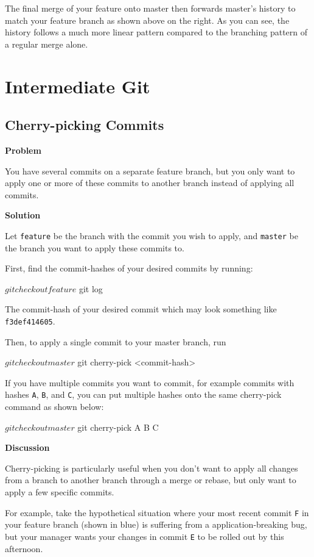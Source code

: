 \documentclass[12pt]{report}
\begin{document}
The final merge of your feature onto master then forwards master's history to match your feature branch as shown above on the right.  As you can see, the history follows a much more linear pattern compared to the branching pattern of a regular merge alone.

\chapter{Intermediate Git}
\section{Cherry-picking Commits}

\textbf{Problem}

You have several commits on a separate feature branch, but you only want to apply one or more of these commits to another branch instead of applying all commits.

\textbf{Solution}

Let \texttt{feature} be the branch with the commit you wish to apply, and \texttt{master} be the branch you want to apply these commits to.

First, find the commit-hashes of your desired commits by running:
\begin{blockcode}
$ git checkout feature
$ git log
\end{blockcode}
The commit-hash of your desired commit which may look something like \texttt{f3def414605}.

Then, to apply a single commit to your master branch, run
\begin{blockcode}
$ git checkout master
$ git cherry-pick <commit-hash>
\end{blockcode}

If you have multiple commits you want to commit, for example commits with hashes \texttt{A}, \texttt{B}, and \texttt{C}, you can put multiple hashes onto the same cherry-pick command as shown below:
\begin{blockcode}
$ git checkout master
$ git cherry-pick A B C
\end{blockcode}

\textbf{Discussion}

Cherry-picking is particularly useful when you don't want to apply all changes from a branch to another branch through a merge or rebase, but only want to apply a few specific commits.

For example, take the hypothetical situation where your most recent commit \texttt{F} in your feature branch (shown in blue) is suffering from a application-breaking bug, but your manager wants your changes in commit \texttt{E} to be rolled out by this afternoon.
\end{document}
